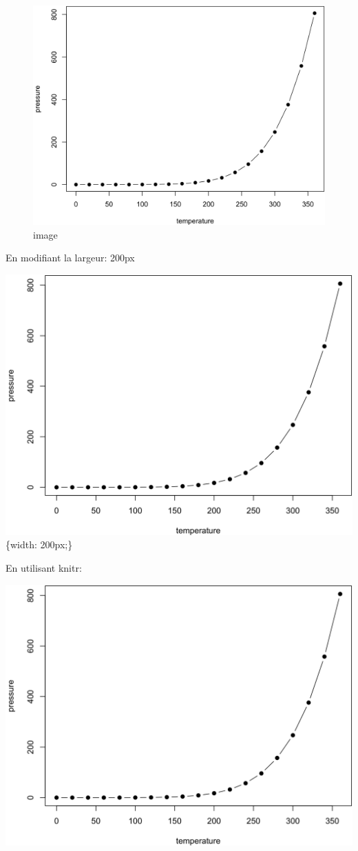 \documentclass[
]{book}
\begin{document}
\begin{figure}
\centering
\includegraphics{figures/fig.png}
\caption{image}
\end{figure}

En modifiant la largeur: 200px

\includegraphics{figures/fig.png}\{width: 200px;\}

En utilisant knitr:

\includegraphics[width=0.5\linewidth]{figures/fig}
\end{document}
